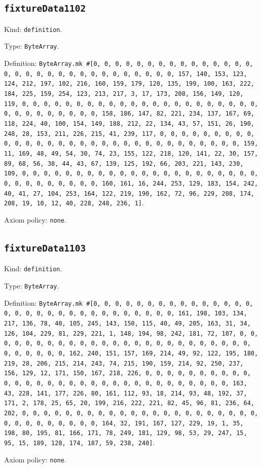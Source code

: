 \documentclass[11pt]{article}
\begin{document}
\subsection*{\texttt{fixtureData1102}}
\noindent Kind: \texttt{definition}.\par
\noindent Type: \texttt{ByteArray}.\par
\noindent Definition: \texttt{ByteArray.mk \#[0, 0, 0, 0, 0, 0, 0, 0, 0, 0, 0, 0, 0, 0, 0, 0, 0, 0, 0, 0, 0, 0, 0, 0, 0, 0, 0, 0, 0, 0, 0, 157, 140, 153, 123, 124, 212, 197, 102, 216, 160, 159, 179, 120, 135, 199, 100, 163, 222, 184, 225, 159, 254, 123, 213, 217, 3, 17, 173, 208, 156, 149, 120, 119, 0, 0, 0, 0, 0, 0, 0, 0, 0, 0, 0, 0, 0, 0, 0, 0, 0, 0, 0, 0, 0, 0, 0, 0, 0, 0, 0, 0, 0, 0, 0, 158, 186, 147, 82, 221, 234, 137, 167, 69, 118, 224, 40, 100, 154, 149, 188, 212, 22, 134, 43, 57, 151, 26, 190, 248, 28, 153, 211, 226, 215, 41, 239, 117, 0, 0, 0, 0, 0, 0, 0, 0, 0, 0, 0, 0, 0, 0, 0, 0, 0, 0, 0, 0, 0, 0, 0, 0, 0, 0, 0, 0, 0, 0, 0, 159, 11, 169, 48, 49, 54, 30, 74, 23, 155, 122, 218, 120, 141, 22, 30, 157, 89, 68, 56, 38, 44, 43, 67, 139, 125, 192, 66, 203, 221, 143, 230, 109, 0, 0, 0, 0, 0, 0, 0, 0, 0, 0, 0, 0, 0, 0, 0, 0, 0, 0, 0, 0, 0, 0, 0, 0, 0, 0, 0, 0, 0, 0, 0, 160, 161, 16, 244, 253, 129, 183, 154, 242, 40, 41, 27, 104, 253, 164, 122, 219, 190, 162, 72, 96, 229, 208, 174, 208, 19, 10, 12, 40, 228, 248, 236, 1]}.\par
\noindent Axiom policy: \texttt{none}.\par
\subsection*{\texttt{fixtureData1103}}
\noindent Kind: \texttt{definition}.\par
\noindent Type: \texttt{ByteArray}.\par
\noindent Definition: \texttt{ByteArray.mk \#[0, 0, 0, 0, 0, 0, 0, 0, 0, 0, 0, 0, 0, 0, 0, 0, 0, 0, 0, 0, 0, 0, 0, 0, 0, 0, 0, 0, 0, 0, 0, 161, 198, 103, 134, 217, 136, 78, 40, 105, 245, 143, 150, 115, 40, 49, 205, 163, 31, 34, 126, 104, 229, 81, 229, 221, 1, 148, 194, 98, 242, 181, 72, 107, 0, 0, 0, 0, 0, 0, 0, 0, 0, 0, 0, 0, 0, 0, 0, 0, 0, 0, 0, 0, 0, 0, 0, 0, 0, 0, 0, 0, 0, 0, 0, 162, 240, 151, 157, 169, 214, 49, 92, 122, 195, 180, 219, 28, 206, 215, 214, 243, 74, 215, 190, 159, 214, 92, 250, 237, 156, 129, 12, 171, 150, 167, 218, 226, 0, 0, 0, 0, 0, 0, 0, 0, 0, 0, 0, 0, 0, 0, 0, 0, 0, 0, 0, 0, 0, 0, 0, 0, 0, 0, 0, 0, 0, 0, 0, 163, 43, 228, 141, 177, 226, 80, 161, 112, 93, 18, 214, 93, 48, 192, 37, 171, 2, 178, 25, 65, 20, 199, 216, 222, 221, 82, 45, 96, 81, 236, 64, 202, 0, 0, 0, 0, 0, 0, 0, 0, 0, 0, 0, 0, 0, 0, 0, 0, 0, 0, 0, 0, 0, 0, 0, 0, 0, 0, 0, 0, 0, 0, 0, 164, 32, 191, 167, 127, 229, 19, 1, 35, 198, 80, 195, 81, 166, 171, 78, 249, 181, 129, 98, 53, 29, 247, 15, 95, 15, 189, 128, 174, 187, 59, 238, 240]}.\par
\noindent Axiom policy: \texttt{none}.\par
\end{document}
